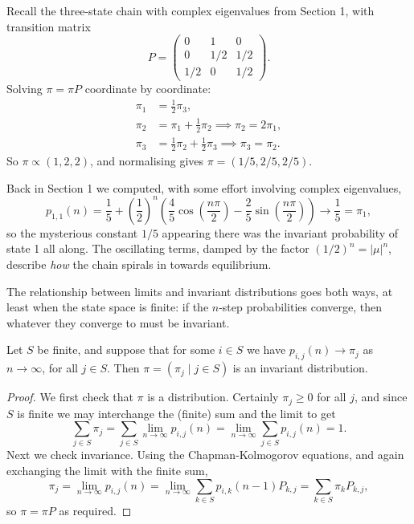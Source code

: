 \documentclass[a4paper]{scrartcl}
\begin{document}
\begin{example}
	Recall the three-state chain with complex eigenvalues from Section 1, with transition matrix
	$$
	P = \begin{pmatrix}
		0 & 1 & 0 \\
		0 & 1/2 & 1/2 \\
		1/2 & 0 & 1/2
	\end{pmatrix}.
	$$
	Solving $\pi = \pi P$ coordinate by coordinate:
	\begin{align*}
		\pi_1 &= \tfrac{1}{2}\pi_3, \\
		\pi_2 &= \pi_1 + \tfrac{1}{2}\pi_2 \implies \pi_2 = 2\pi_1, \\
		\pi_3 &= \tfrac{1}{2}\pi_2 + \tfrac{1}{2}\pi_3 \implies \pi_3 = \pi_2.
	\end{align*}
	So $\pi \propto (1, 2, 2)$, and normalising gives $\pi = (1/5, 2/5, 2/5)$.

	Back in Section 1 we computed, with some effort involving complex eigenvalues,
	$$
	p_{1,1}(n) = \frac{1}{5} + \left(\frac{1}{2}\right)^n \left(\frac{4}{5}\cos\left(\frac{n \pi}{2}\right) - \frac{2}{5} \sin \left(\frac{n \pi}{2}\right)\right) \longrightarrow \frac{1}{5} = \pi_1,
	$$
	so the mysterious constant $1/5$ appearing there was the invariant probability of state 1 all along. The oscillating terms, damped by the factor $(1/2)^n = |\mu|^n$, describe \emph{how} the chain spirals in towards equilibrium.
\end{example}

The relationship between limits and invariant distributions goes both ways, at least when the state space is finite: if the $n$-step probabilities converge, then whatever they converge to must be invariant.

\begin{theorem}
	Let $S$ be finite, and suppose that for some $i \in S$ we have
	$
	p_{i, j}(n) \rightarrow \pi_j
	$
	as $n \rightarrow \infty$, for all $j \in S$. Then $\pi = (\pi_j \mid j \in S)$ is an invariant distribution.
\end{theorem}
\begin{proof}
	We first check that $\pi$ is a distribution. Certainly $\pi_j \geq 0$ for all $j$, and since $S$ is finite we may interchange the (finite) sum and the limit to get
	$$
	\sum_{j \in S} \pi_j = \sum_{j \in S}\lim_{n \to \infty} p_{i, j}(n) = \lim_{n \to \infty}\sum_{j \in S} p_{i, j}(n) = 1.
	$$
	Next we check invariance. Using the Chapman-Kolmogorov equations, and again exchanging the limit with the finite sum,
	$$
	\pi_j = \lim_{n \to \infty} p_{i, j}(n) = \lim_{n \to \infty}\sum_{k \in S} p_{i, k}(n - 1)P_{k, j} = \sum_{k \in S} \pi_k P_{k, j},
	$$
	so $\pi = \pi P$ as required.
\end{proof}
\end{document}
